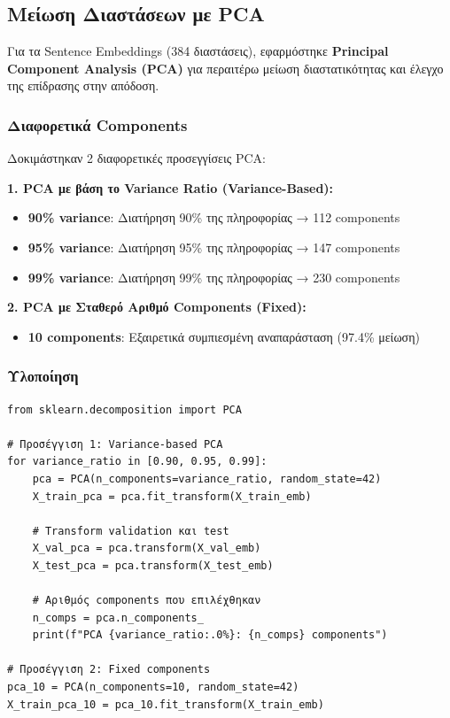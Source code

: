 \documentclass[12pt,a4paper,twoside]{book}
\begin{document}
\subsection{Μείωση Διαστάσεων με PCA}

Για τα Sentence Embeddings (384 διαστάσεις), εφαρμόστηκε \textbf{Principal Component Analysis (PCA)} για περαιτέρω μείωση διαστατικότητας και έλεγχο της επίδρασης στην απόδοση.

\subsubsection*{Διαφορετικά Components}

Δοκιμάστηκαν 2 διαφορετικές προσεγγίσεις PCA:

\textbf{1. PCA με βάση το Variance Ratio (Variance-Based):}
\begin{itemize}
    \item \textbf{90\% variance}: Διατήρηση 90\% της πληροφορίας → 112 components
    \item \textbf{95\% variance}: Διατήρηση 95\% της πληροφορίας → 147 components
    \item \textbf{99\% variance}: Διατήρηση 99\% της πληροφορίας → 230 components
\end{itemize}

\textbf{2. PCA με Σταθερό Αριθμό Components (Fixed):}
\begin{itemize}
    \item \textbf{10 components}: Εξαιρετικά συμπιεσμένη αναπαράσταση (97.4\% μείωση)
\end{itemize}

\subsubsection*{Υλοποίηση}

\begin{tcolorbox}[myCustomStyle={PCA Dimensionality Reduction}]
    \begin{lstlisting}[style=myPythonStyle]
from sklearn.decomposition import PCA

# Προσέγγιση 1: Variance-based PCA
for variance_ratio in [0.90, 0.95, 0.99]:
    pca = PCA(n_components=variance_ratio, random_state=42)
    X_train_pca = pca.fit_transform(X_train_emb)
    
    # Transform validation και test
    X_val_pca = pca.transform(X_val_emb)
    X_test_pca = pca.transform(X_test_emb)
    
    # Αριθμός components που επιλέχθηκαν
    n_comps = pca.n_components_
    print(f"PCA {variance_ratio:.0%}: {n_comps} components")

# Προσέγγιση 2: Fixed components
pca_10 = PCA(n_components=10, random_state=42)
X_train_pca_10 = pca_10.fit_transform(X_train_emb)
\end{lstlisting}
\end{tcolorbox}
\end{document}
